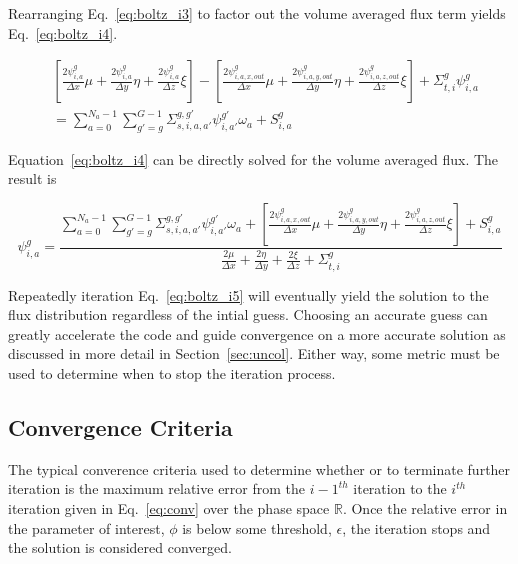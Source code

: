 Rearranging Eq.~\ref{eq:boltz_i3} to factor out the volume averaged flux term yields Eq.~\ref{eq:boltz_i4}.

\begin{equation} \label{eq:boltz_i4}
\begin{split}
&\left[ 
\frac{2\psi_{i,a}^{g}}{\Delta x} \mu + 
\frac{2\psi_{i,a}^{g}}{\Delta y} \eta + 
\frac{2\psi_{i,a}^{g}}{\Delta z} \xi
\right] - 
\left[ 
\frac{2\psi_{i,a,x,out}^g}{\Delta x} \mu + 
\frac{2\psi_{i,a,y,out}^g}{\Delta y} \eta + 
\frac{2\psi_{i,a,z,out}^g}{\Delta z} \xi
\right]
+ \Sigma_{t,i}^g \psi_{i,a}^{g} \\
& = 
\sum_{a=0}^{N_a-1} \sum_{g'=g}^{G-1} \Sigma_{s, i, a, a'}^{g, g'} \psi_{i, a'}^{g'} \omega_a + S_{i,a}^g
\end{split}
\end{equation}

Equation~\ref{eq:boltz_i4} can be directly solved for the volume averaged flux. The result is

\begin{equation} \label{eq:boltz_i5}
\psi_{i,a}^{g} = 
\frac{
  \sum_{a=0}^{N_a-1} \sum_{g'=g}^{G-1} \Sigma_{s, i, a, a'}^{g, g'} \psi_{i,     a'}^{g'} \omega_a + 
  \left[ 
    \frac{2\psi_{i,a,x,out}^g}{\Delta x} \mu + 
    \frac{2\psi_{i,a,y,out}^g}{\Delta y} \eta + 
    \frac{2\psi_{i,a,z,out}^g}{\Delta z} \xi
  \right] + S_{i,a}^g
}{
  \frac{2\mu}{\Delta x}  + 
  \frac{2\eta}{\Delta y} + 
  \frac{2\xi}{\Delta z} + 
  \Sigma_{t,i}^g
}
\end{equation}

Repeatedly iteration Eq.~\ref{eq:boltz_i5} will eventually yield the solution to the flux distribution regardless of the intial guess. Choosing an accurate guess can greatly accelerate the code and guide convergence on a more accurate solution as discussed in more detail in Section~\ref{sec:uncol}. Either way, some metric must be used to determine when to stop the iteration process.

\subsection{Convergence Criteria}
The typical converence criteria used to determine whether or to terminate further iteration is the maximum relative error from the $i-1^{th}$ iteration to the $i^{th}$ iteration given in Eq.~\ref{eq:conv} over the phase space $\mathbb{R}$. Once the relative error in the parameter of interest, $\phi$ is below some threshold, $\epsilon$, the iteration stops and the solution is considered converged.

